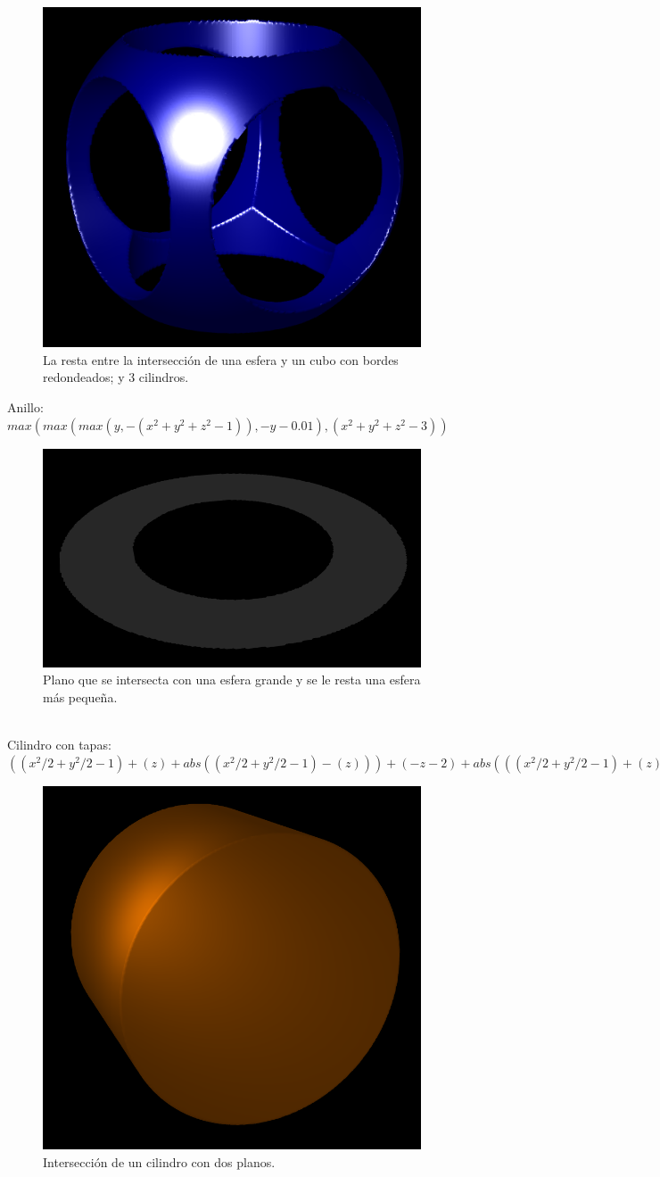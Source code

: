 \documentclass[12pt]{article}
\begin{document}
\begin{figure}[h!]
\includegraphics[width=0.7\linewidth,center]{g2.png}
\caption{La resta entre la intersección de una esfera y un cubo con bordes redondeados; y 3 cilindros.}
\end{figure}
\clearpage
Anillo: $max(max(max(y,- (x^2 + y^2 + z^2-1)), -y- 0.01), (x^2 +y^2 +z^2 - 3))$ \\
\begin{figure}[h!]
\includegraphics[width=0.7\linewidth,center]{g3.png}
\caption{Plano que se intersecta con una esfera grande y se le resta una esfera más pequeña.}
\end{figure}
\\Cilindro con tapas: $((x^2/2 + y^2/2 - 1) + (z) + abs((x^2/2 + y^2/2 - 1)-(z)))+(-z-2)+abs(((x^2/2 + y^2/2 - 1) + (z) + abs((x^2/2 + y^2/2 - 1)-(z)))-(-z-2))$ \\
\begin{figure}[h!]
\includegraphics[width=0.7\linewidth,center]{g4.png}
\caption{Intersección de un cilindro con dos planos.}
\end{figure}
\end{document}
